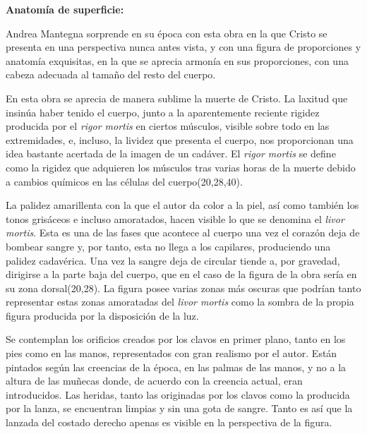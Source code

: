 

\vspace{12pt}
\textbf{Anatomía de superficie:}

Andrea Mantegna sorprende en su época con esta obra en la que Cristo se presenta en una perspectiva nunca antes vista, y con una figura de proporciones y anatomía exquisitas,%
en la que se aprecia armonía en sus proporciones, con una cabeza adecuada al tamaño del resto del cuerpo.

En esta obra se aprecia de manera sublime la muerte de Cristo. La laxitud que insinúa haber tenido el cuerpo, junto a la aparentemente reciente rigidez producida por el \textit{rigor mortis} en ciertos músculos, visible sobre todo en las extremidades, e, incluso, la lividez que presenta el cuerpo, nos proporcionan una idea bastante acertada de la imagen de un cadáver. El \textit{rigor mortis} se define como la rigidez que adquieren los músculos tras varias horas de la muerte debido a cambios químicos en las células del cuerpo(20,28,40).

La palidez amarillenta con la que el autor da color a la piel, así como también los tonos grisáceos e incluso amoratados, hacen visible lo que se denomina el \textit{livor mortis}. Esta es una de las fases que acontece al cuerpo una vez el corazón deja de bombear sangre y, por tanto, esta no llega a los capilares, produciendo una palidez cadavérica. Una vez la sangre deja de circular tiende a, por gravedad, dirigirse a la parte baja del cuerpo, que en el caso de la figura de la obra sería en su zona dorsal(20,28). La figura posee varias zonas más oscuras que podrían tanto representar estas zonas amoratadas del \textit{livor mortis} como la sombra de la propia figura producida por la disposición de la luz.

Se contemplan los orificios creados por los clavos en primer plano, tanto en los pies como en las manos, representados con gran realismo por el autor. Están pintados según las creencias de la época, en las palmas de las manos, y no a la altura de las muñecas donde, de acuerdo con la creencia actual, eran introducidos.
Las heridas, tanto las originadas por los clavos como la producida por la lanza, se encuentran limpias y sin una gota de sangre. Tanto es así que la lanzada del costado derecho apenas es visible en la perspectiva de la figura. 

